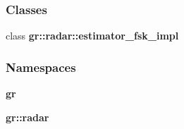 \subsubsection*{Classes}
\begin{DoxyCompactItemize}
\item 
class {\bf gr\+::radar\+::estimator\+\_\+fsk\+\_\+impl}
\end{DoxyCompactItemize}
\subsubsection*{Namespaces}
\begin{DoxyCompactItemize}
\item 
 {\bf gr}
\item 
 {\bf gr\+::radar}
\end{DoxyCompactItemize}
